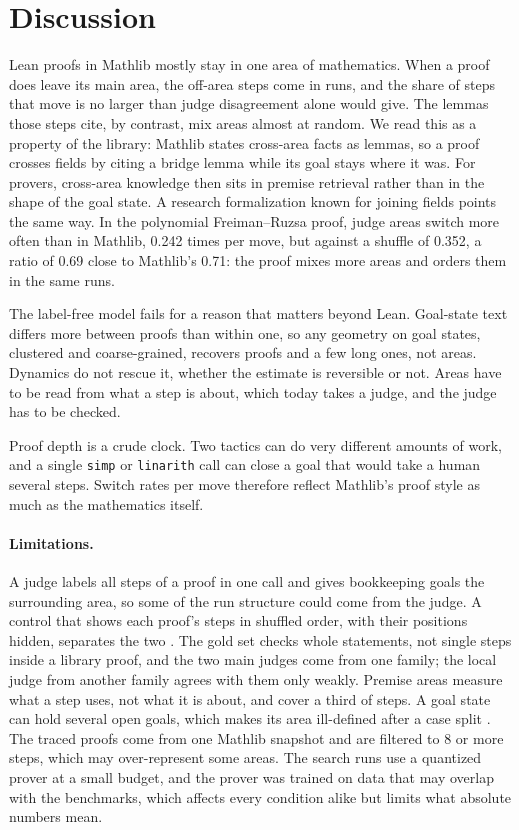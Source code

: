 \section{Discussion}
\label{sec:discussion}

Lean proofs in Mathlib mostly stay in one area of mathematics. When a proof
does leave its main area, the off-area steps come in runs, and the share of
steps that move is no larger than judge disagreement alone would give. The
lemmas those steps cite, by contrast, mix areas almost at random. We read
this as a property of the library: Mathlib states cross-area facts as lemmas,
so a proof crosses fields by citing a bridge lemma while its goal stays where
it was. For provers, cross-area knowledge then sits in premise retrieval
rather than in the shape of the goal state. A research formalization known
for joining fields points the same way. In the polynomial Freiman--Ruzsa
proof, judge areas switch more often than in Mathlib, 0.242 times per move,
but against a shuffle of 0.352, a ratio of 0.69 close to Mathlib's 0.71: the
proof mixes more areas and orders them in the same runs.

The label-free model fails for a reason that matters beyond Lean. Goal-state
text differs more between proofs than within one, so any geometry on goal
states, clustered and coarse-grained, recovers proofs and a few long ones,
not areas. Dynamics do not rescue it, whether the estimate is reversible or
not. Areas have to be read from what a step is about, which today takes a
judge, and the judge has to be checked.

Proof depth is a crude clock. Two tactics can do very different amounts of
work, and a single \texttt{simp} or \texttt{linarith} call can close a goal
that would take a human several steps. Switch rates per move therefore
reflect Mathlib's proof style as much as the mathematics itself.

\paragraph{Limitations.}
A judge labels all steps of a proof in one call and gives bookkeeping goals
the surrounding area, so some of the run structure could come from the
judge. A control that shows each proof's steps in shuffled order, with their
positions hidden, separates the two . The gold
set checks whole statements, not single steps inside a library proof, and
the two main judges come from one family; the local judge from another
family agrees with them only weakly. Premise areas measure what a step uses,
not what it is about, and cover a third of steps. A goal state can hold
several open goals, which makes its area ill-defined after a case split
. The traced proofs come from one Mathlib
snapshot and are filtered to 8 or more steps, which may over-represent some
areas. The search runs use a quantized prover at a small budget, and the
prover was trained on data that may overlap with the benchmarks, which
affects every condition alike but limits what absolute numbers mean.
